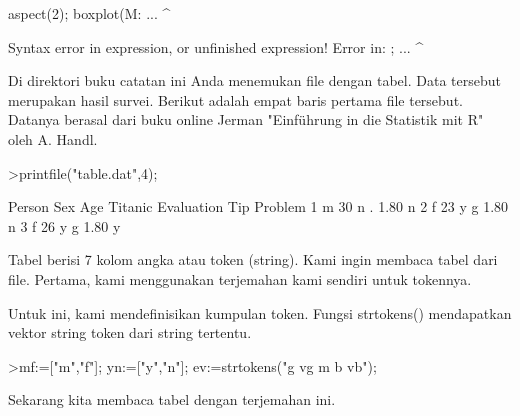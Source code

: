 \documentclass[a4paper,10pt]{article}
\begin{document}
\begin{eulernotebook}
\begin{eulercomment}
\begin{eulercomment}
\begin{euleroutput}
  aspect(2); boxplot(M: ...
  ^
\end{euleroutput}
\begin{euleroutput}
  Syntax error in expression, or unfinished expression!
  Error in:
  ; ...
  ^
\end{euleroutput}
\begin{eulercomment}
Di direktori buku catatan ini Anda menemukan file dengan tabel. Data
tersebut merupakan hasil survei. Berikut adalah empat baris pertama
file tersebut. Datanya berasal dari buku online Jerman "Einführung in
die Statistik mit R" oleh A. Handl.
\end{eulercomment}
\begin{eulerprompt}
>printfile("table.dat",4);
\end{eulerprompt}
\begin{euleroutput}
  Person Sex Age Titanic Evaluation Tip Problem
  1 m 30 n . 1.80 n
  2 f 23 y g 1.80 n
  3 f 26 y g 1.80 y
\end{euleroutput}
\begin{eulercomment}
Tabel berisi 7 kolom angka atau token (string). Kami ingin membaca
tabel dari file. Pertama, kami menggunakan terjemahan kami sendiri
untuk tokennya.

Untuk ini, kami mendefinisikan kumpulan token. Fungsi strtokens()
mendapatkan vektor string token dari string tertentu.
\end{eulercomment}
\begin{eulerprompt}
>mf:=["m","f"]; yn:=["y","n"]; ev:=strtokens("g vg m b vb");
\end{eulerprompt}
\begin{eulercomment}
Sekarang kita membaca tabel dengan terjemahan ini.


\end{eulercomment}
\end{eulercomment}
\end{eulercomment}
\end{eulernotebook}
\end{document}
